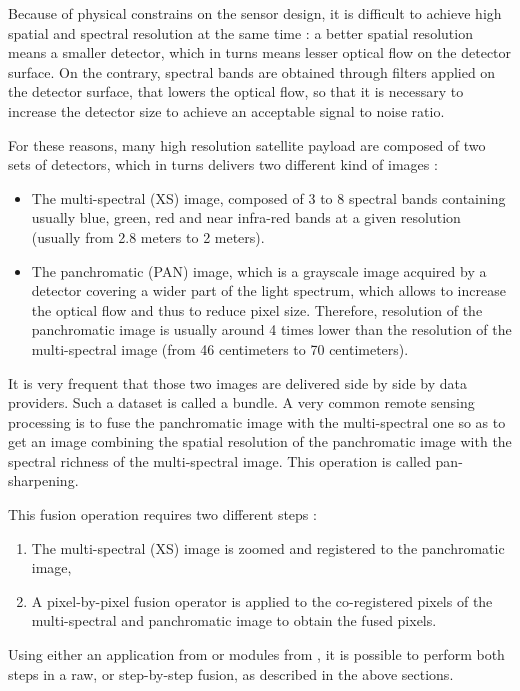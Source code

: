 Because of physical constrains on the sensor design, it is difficult
to achieve high spatial and spectral resolution at the same time : a
better spatial resolution means a smaller detector, which in turns
means lesser optical flow on the detector surface. On the contrary,
spectral bands are obtained through filters applied on the detector
surface, that lowers the optical flow, so that it is necessary to
increase the detector size to achieve an acceptable signal to noise
ratio.

For these reasons, many high resolution satellite payload are composed
of two sets of detectors, which in turns delivers two different kind
of images :

\begin{itemize}
\item The multi-spectral (XS) image, composed of 3 to 8 spectral bands
  containing usually blue, green, red and near infra-red bands at a
  given resolution (usually from 2.8 meters to 2 meters).
\item The panchromatic (PAN) image, which is a grayscale image acquired by a
  detector covering a wider part of the light spectrum, which allows
  to increase the optical flow and thus to reduce pixel
  size. Therefore, resolution of the panchromatic image is usually
  around 4 times lower than the resolution of the multi-spectral image
  (from 46 centimeters to 70 centimeters).
\end{itemize}

It is very frequent that those two images are delivered side by side
by data providers. Such a dataset is called a bundle. A very common
remote sensing processing is to fuse the panchromatic image with the
multi-spectral one so as to get an image combining the spatial
resolution of the panchromatic image with the spectral richness of the
multi-spectral image. This operation is called pan-sharpening.

This fusion operation requires two different steps :
\begin{enumerate}
\item The multi-spectral (XS) image is zoomed and registered to the
  panchromatic image,
\item A pixel-by-pixel fusion operator is applied to the co-registered
  pixels of the multi-spectral and panchromatic image to obtain the
  fused pixels.
\end{enumerate}

Using either an application from \app or modules from \mont, it is
possible to perform both steps in a raw, or step-by-step fusion, as
described in the above sections.

